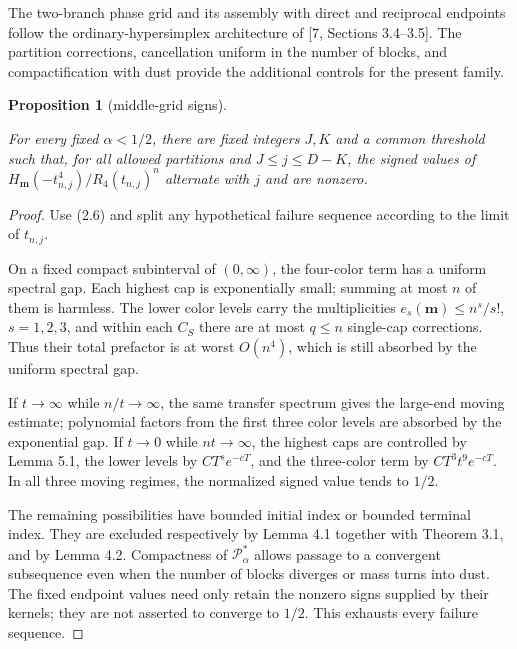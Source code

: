 \documentclass[11pt]{article}
\newtheorem{proposition}[theorem]{Proposition}
\begin{document}
The two-branch phase grid and its assembly with direct and reciprocal
endpoints follow the ordinary-hypersimplex architecture of [7, Sections
3.4--3.5].  The partition corrections, cancellation uniform in the number
of blocks, and compactification with dust provide the additional controls
for the present family.

\Needspace{0.16\textheight}
\begin{proposition}[middle-grid signs]
\label{proposition:6-1}

For every fixed $\alpha<1/2$, there are fixed integers $J,K$ and a common
threshold such that, for all allowed partitions and
$J\le j\le D-K$, the signed values of
$H_{\mathbf m}(-t_{n,j}^4)/R_4(t_{n,j})^n$ alternate with $j$ and are
nonzero.

\end{proposition}

\begin{proof}


Use (2.6) and split any hypothetical failure sequence according to the limit of
$t_{n,j}$.

On a fixed compact subinterval of $(0,\infty)$, the four-color term has a
uniform spectral gap.  Each highest cap is exponentially small; summing at most
$n$ of them is harmless.  The lower color levels carry the multiplicities
$e_s(\mathbf m)\le n^s/s!$, $s=1,2,3$, and within each $C_S$
there are at most $q\le n$ single-cap corrections.  Thus their total
prefactor is at worst $O(n^4)$, which is still absorbed by the uniform
spectral gap.

If $t\to\infty$ while $n/t\to\infty$, the same transfer spectrum gives the
large-end moving estimate; polynomial factors from the first three color levels
are absorbed by the exponential gap.  If $t\to0$ while $nt\to\infty$, the
highest caps are controlled by Lemma 5.1, the lower levels by
$C T^s e^{-cT}$, and the three-color term by
$CT^3t^9e^{-cT}$.  In all three moving regimes, the normalized signed value
tends to $1/2$.

The remaining possibilities have bounded initial index or bounded terminal index.
They are excluded respectively by Lemma 4.1 together with Theorem 3.1, and by
Lemma 4.2.  Compactness of $\mathcal P_\alpha^*$ allows passage to a convergent
subsequence even when the number of blocks diverges or mass turns into dust.  The
fixed endpoint values need only retain the nonzero signs supplied by their kernels;
they are not asserted to converge to $1/2$.  This exhausts every failure
sequence.
\end{proof}
\end{document}
